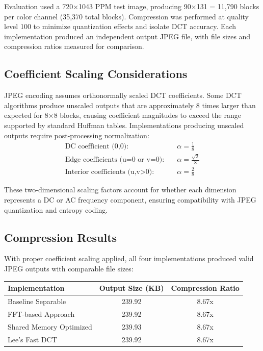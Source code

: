 \documentclass{article}
\begin{document}
Evaluation used a 720×1043 PPM test image, producing 90×131 = 11,790 blocks per color channel (35,370 total blocks). Compression was performed at quality level 100 to minimize quantization effects and isolate DCT accuracy. Each implementation produced an independent output JPEG file, with file sizes and compression ratios measured for comparison.

\subsection{Coefficient Scaling Considerations}

JPEG encoding assumes orthonormally scaled DCT coefficients. Some DCT algorithms produce unscaled outputs that are approximately 8 times larger than expected for 8×8 blocks, causing coefficient magnitudes to exceed the range supported by standard Huffman tables. Implementations producing unscaled outputs require post-processing normalization:
\begin{align}
\text{DC coefficient (0,0):} &\quad \alpha = \frac{1}{8} \\
\text{Edge coefficients (u=0 or v=0):} &\quad \alpha = \frac{\sqrt{2}}{8} \\
\text{Interior coefficients (u,v>0):} &\quad \alpha = \frac{2}{8}
\end{align}

These two-dimensional scaling factors account for whether each dimension represents a DC or AC frequency component, ensuring compatibility with JPEG quantization and entropy coding.

\subsection{Compression Results}

With proper coefficient scaling applied, all four implementations produced valid JPEG outputs with comparable file sizes:

\begin{center}
\begin{tabular}{lcc}
\toprule
Implementation & Output Size (KB) & Compression Ratio \\
\midrule
Baseline Separable & 239.92 & 8.67x \\
FFT-based Approach & 239.92 & 8.67x \\
Shared Memory Optimized & 239.93 & 8.67x \\
Lee's Fast DCT & 239.92 & 8.67x \\
\bottomrule
\end{tabular}
\end{center}
\end{document}

